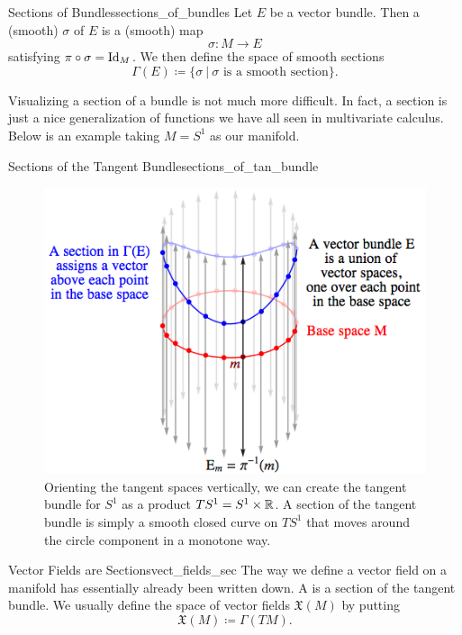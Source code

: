 \begin{df}{Sections of Bundles}{sections_of_bundles}
Let $E$ be a vector bundle.  Then a (smooth)  $\sigma$ of $E$ is a (smooth) map
\[
\sigma \colon M \to E
\]
satisfying $\pi \circ \sigma = \mathrm{Id}_M$. We then define the space of smooth sections
\[
\Gamma(E)\coloneqq \{\sigma ~\vert~ \textrm{$\sigma$ is a smooth section}\}.
\]
\end{df}

Visualizing a section of a bundle is not much more difficult.  In fact, a section is just a nice generalization of functions we have all seen in multivariate calculus.  Below is an example taking $M=S^1$ as our manifold. 


\begin{fig}{Sections of the Tangent Bundle}{sections_of_tan_bundle}
\begin{figure}[H]
    \centering
    \includegraphics[width=.6\textwidth]{TACA_2019/s1_tan_bundle.png}
    \caption{Orienting the tangent spaces vertically, we can create the tangent bundle for $S^1$ as a product $TS^1=S^1\times \mathbb{R}$. A section of the tangent bundle is simply a smooth closed curve on $TS^1$ that moves around the circle component in a monotone way.}
    \label{fig:tangent_bundle_sec}
\end{figure}
\end{fig}

\begin{rmk}{Vector Fields are Sections}{vect_fields_sec}
The way we define a vector field on a manifold has essentially already been written down. A  is a section of the tangent bundle. We usually define the space of vector fields $\mathfrak{X}(M)$ by putting
\[
\mathfrak{X}(M)\coloneqq \Gamma(TM).
\]
\end{rmk}


